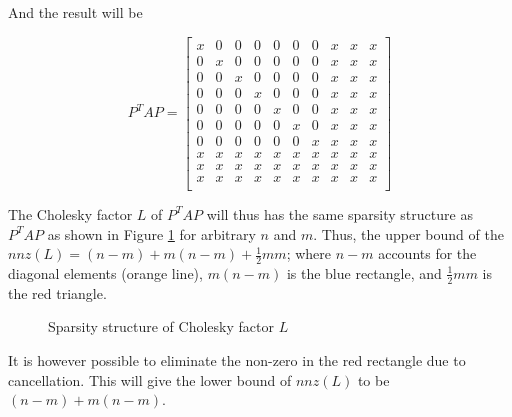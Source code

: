 And the result will be 

$$
P^{T}AP = 
\begin{bmatrix}
x &  0 &  0 &  0 &  0 &  0 &  0 &  x &  x &  x\\
0 &  x &  0 &  0 &  0 &  0 &  0 &  x &  x &  x\\
0 &  0 &  x &  0 &  0 &  0 &  0 &  x &  x &  x\\
0 &  0 &  0 &  x &  0 &  0 &  0 &  x &  x &  x\\
0 &  0 &  0 &  0 &  x &  0 &  0 &  x &  x &  x\\
0 &  0 &  0 &  0 &  0 &  x &  0 &  x &  x &  x\\
0 &  0 &  0 &  0 &  0 &  0 &  x &  x &  x &  x\\
x &  x &  x &  x &  x &  x &  x &  x &  x &  x\\
x &  x &  x &  x &  x &  x &  x &  x &  x &  x\\
x &  x &  x &  x &  x &  x &  x &  x &  x &  x\\       
\end{bmatrix}
$$

The Cholesky factor $L$ of $P^{T}AP$ will thus has the same sparsity structure as $P^{T}AP$ as shown in Figure \ref{fig:mat} for arbitrary $n$ and $m$. Thus, the upper bound of the $nnz(L) = (n-m) + m(n-m) + \frac{1}{2}mm$; where $n - m$ accounts for the diagonal elements (orange line), $m(n-m)$ is the blue rectangle, and $\frac{1}{2}mm$ is the red triangle. 


\begin{figure}[!tbh]
\centering        
   \caption{Sparsity structure of Cholesky factor $L$}
  \label{fig:mat}
\end{figure}

It is however possible to eliminate the non-zero in the red rectangle due to cancellation. This will give the lower bound of $nnz(L)$ to be $(n-m) + m(n-m)$. 
